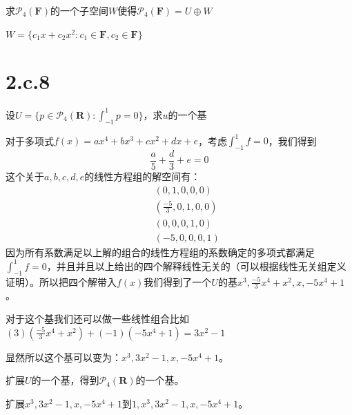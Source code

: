\documentclass[10pt,a4paper,UTF8]{article}
\begin{document}
\begin{problem}
求\(\mathcal{P}_{4}(\mathbf{F})\)的一个子空间\(W\)使得\(\mathcal{P}_{4}( \mathbf{F}) = U\oplus W\)
\end{problem}

\begin{answer}
\(W = \{c_{1}x + c_{2}x^{2}:c_{1}\in \mathbf{F},c_{2} \in \mathbf{F}\}\)
\end{answer}

\section{2.c.8}
\label{sec:org32a49e5}


\begin{problem}
设\(U=\{p\in \mathcal{P}_{4}(\mathbf{R}):\int_{-1}^{1}p = 0\}\)，求\(u\)的一个基
\end{problem}

\begin{answer}
对于多项式\(f(x) = ax^{4} + bx^{3} + cx^{2} + dx + e\)，考虑\(\int_{-1}^{1}f = 0\)，我们得到
\begin{equation}
\label{eq:1}
\frac{a}{5} + \frac{d}{3} + e = 0
\end{equation}
这个关于\(a,b,c,d,e\)的线性方程组的解空间有：
\begin{eqnarray}
\label{eq:2}
&&(0,1,0,0,0) \\
&&(\frac{-5}{3},0,1,0,0) \\
&&(0,0,0,1,0) \\
&&(-5,0,0,0,1) 
\end{eqnarray}
因为所有系数满足以上解的组合的线性方程组的系数确定的多项式都满足\(\int_{-1}^{1}f = 0\)，并且并且以上给出的四个解释线性无关的（可以根据线性无关组定义证明）。所以把四个解带入\(f(x)\)我们得到了一个\(U\)的基\(x^{3},\frac{-5}{3}x^{4} +x^{2}, x, -5x^{4} + 1\)。

对于这个基我们还可以做一些线性组合比如\((3)(\frac{-5}{3}x^{4} +x^{2}) + (-1)(-5x^{4} + 1) = 3x^{2} -1\)

显然所以这个基可以变为：\(x^{3},3x^{2} -1, x, -5x^{4} + 1\)。
\end{answer}

\begin{problem}
扩展\(U\)的一个基，得到\(\mathcal{P}_{4}( \mathbf{R})\)的一个基。
\end{problem}

\begin{answer}
扩展\(x^{3},3x^{2} -1, x, -5x^{4} + 1\)到\(1, x^{3},3x^{2} -1, x, -5x^{4} + 1\)。
\end{answer}
\end{document}
